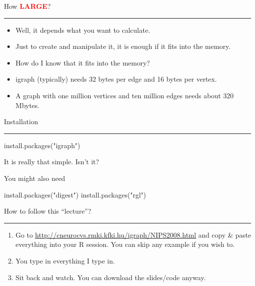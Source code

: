 \documentclass[landscape,fleqno]{foils}
\newcommand{\stitle}[1]{{\color{blue}\Large #1\par\vspace*{10pt}\hrule}}
\renewcommand{\emph}[1]{\textcolor{red}{\bf #1}}
\begin{document}
\newpage
\stitle{How \emph{LARGE}?}

\begin{itemize}
\item Well, it depends what you want to calculate. \pause
\item Just to create and manipulate it, it is enough
  if it fits into the memory. \pause
\item How do I know that it fits into the memory? \pause
\item igraph (typically) needs 32 bytes per edge and 16 bytes per
  vertex. \pause
\item A graph with one million vertices and ten million edges needs 
  about 320 Mbytes.
\end{itemize}

\newpage
\stitle{Installation}

\begin{Myverb}
  install.packages("igraph")
\end{Myverb}

It is really that simple. Isn't it? \pause
\vspace*{2cm}

You might also need\vspace*{-1cm}
\begin{Myverb}
  install.packages("digest")
  install.packages("rgl")
\end{Myverb}

\newpage
\stitle{How to follow this ``lecture''?}
\begin{enumerate}
\item Go to \textcolor{red}{\url{http://cneurocvs.rmki.kfki.hu/igraph/NIPS2008.html}} and 
  copy \& paste everything into your R session. You can skip any
  example if you wish to.
  \pause
\item You type in everything I type in. \pause
\item Sit back and watch. You can download the slides/code anyway.
\end{enumerate}
\end{document}
